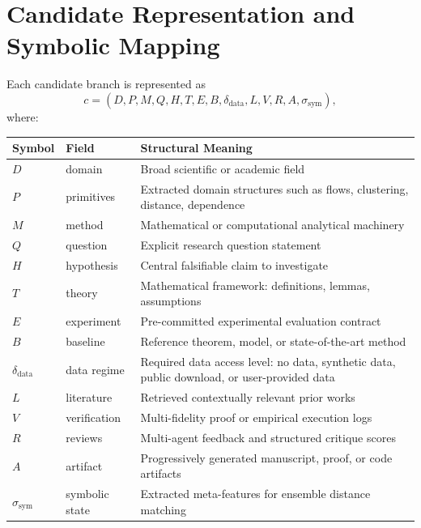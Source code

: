 \documentclass[11pt]{article}
\begin{document}
\section{Candidate Representation and Symbolic Mapping}

Each candidate branch is represented as
$$
c = (D, P, M, Q, H, T, E, B, \delta_{\text{data}}, L, V, R, A, \sigma_{\text{sym}}),
$$
where:
\begin{center}
\begin{tabular}{lll}
\toprule
Symbol & Field & Structural Meaning \\
\midrule
$D$ & domain & Broad scientific or academic field \\
$P$ & primitives & Extracted domain structures such as flows, clustering, distance, dependence \\
$M$ & method & Mathematical or computational analytical machinery \\
$Q$ & question & Explicit research question statement \\
$H$ & hypothesis & Central falsifiable claim to investigate \\
$T$ & theory & Mathematical framework: definitions, lemmas, assumptions \\
$E$ & experiment & Pre-committed experimental evaluation contract \\
$B$ & baseline & Reference theorem, model, or state-of-the-art method \\
$\delta_{\text{data}}$ & data regime & Required data access level: no data, synthetic data, public download, or user-provided data \\
$L$ & literature & Retrieved contextually relevant prior works \\
$V$ & verification & Multi-fidelity proof or empirical execution logs \\
$R$ & reviews & Multi-agent feedback and structured critique scores \\
$A$ & artifact & Progressively generated manuscript, proof, or code artifacts \\
$\sigma_{\text{sym}}$ & symbolic state & Extracted meta-features for ensemble distance matching \\
\bottomrule
\end{tabular}
\end{center}
\end{document}
